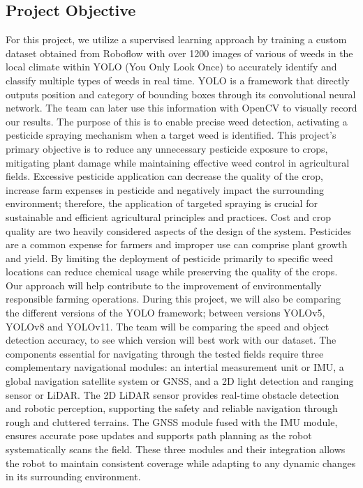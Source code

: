 \documentclass[conference]{IEEEtran}
\begin{document}
\subsection{Project Objective}
For this project, we utilize a supervised learning approach by training a custom dataset obtained from Roboflow with over 1200 images of various of weeds in the local climate within YOLO (You Only Look Once) to accurately identify and classify multiple types of weeds in real time. YOLO is a framework that directly outputs position and category of bounding boxes through its convolutional neural network. The team can later use this information with OpenCV to visually record our results. The purpose of this is to enable precise weed detection, activating a pesticide spraying mechanism when a target weed is identified. This project’s primary objective is to reduce any unnecessary pesticide exposure to crops, mitigating plant damage while maintaining effective weed control in agricultural fields. Excessive pesticide application can decrease the quality of the crop, increase farm expenses in pesticide and negatively impact the surrounding environment; therefore, the application of targeted spraying is crucial for sustainable and efficient agricultural principles and practices. Cost and crop quality are two heavily considered aspects of the design of the system. Pesticides are a common expense for farmers and improper use can comprise plant growth and yield. By limiting the deployment of pesticide primarily to specific weed locations can reduce chemical usage while preserving the quality of the crops. Our approach will help contribute to the improvement of environmentally responsible farming operations. During this project, we will also be comparing the different versions of the YOLO framework; between versions YOLOv5, YOLOv8 and YOLOv11. The team will be comparing the speed and object detection accuracy, to see which version will best work with our dataset. The components essential for navigating through the tested fields require three complementary navigational modules: an intertial measurement unit or IMU, a global navigation satellite system or GNSS, and a 2D light detection and ranging sensor or LiDAR. The 2D LiDAR sensor provides real-time obstacle detection and robotic perception, supporting the safety and reliable navigation through rough and cluttered terrains. The GNSS module  fused with the IMU module, ensures accurate pose updates and supports path planning as the robot systematically scans the field. These three modules and their integration allows the robot to maintain consistent coverage while adapting to any dynamic changes in its surrounding environment.
\end{document}
